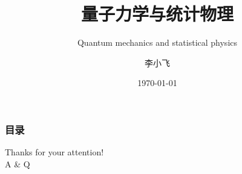 \documentclass[12pt,UTF8,aspectratio=169]{beamer}
\begin{document}

\author{\myfont 李小飞}
\title{\textbf{\Huge 量子力学与统计物理}}
\subtitle{Quantum mechanics and statistical physics}
\date{\today}

    \frame[plain]{\titlepage}
   \begin{frame}
        \frametitle{目录}
        \tableofcontents
    \end{frame}


%

%
%
%  
%  
%
%  

\begin{frame}
	\begin{center}
		\huge Thanks for your attention! \\ \vspace{1.0em}
         A \& Q
	\end{center}
\end{frame}

\end{document}
